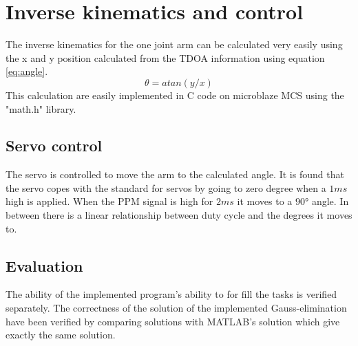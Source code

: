 \section{Inverse kinematics and control }
\label{sec:mechanics_kinematics}
The inverse kinematics for the one joint arm can be calculated very easily using the x and y position calculated from the TDOA information using equation \ref{eq:angle}.
\begin{equation}
\theta = atan(y/x)
\label{eq:angle}
\end{equation}
This calculation are easily implemented in C code on microblaze MCS using the "math.h" library.
\subsection{Servo control}
The servo is controlled to move the arm to the calculated angle. It is found that the servo copes with the standard for servos by going to zero degree when a $1\si{ms}$ high is applied. When the PPM signal is high for $2\si{ms}$ it moves to a $90\si{\degree}$ angle. In between there is a linear relationship between duty cycle and the degrees it moves to.
%
\subsection{Evaluation}
The ability of the implemented program's ability to for fill the tasks is verified separately. The correctness of the solution of the implemented Gauss-elimination have been verified by comparing solutions with MATLAB's solution which give exactly the same solution.